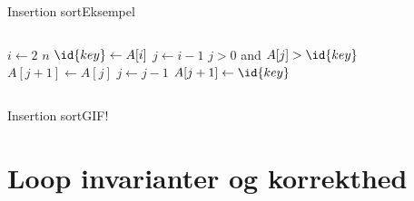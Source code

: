 \documentclass[aspectratio=1610]{beamer}
\begin{document}
\begin{frame}[fragile]{Insertion sort}{Eksempel}
\begin{columns}

        \begin{minipage}{\textwidth}%
            \small

            \vspace{-\abovedisplayskip}
            \begin{codebox}
                \li \For $i \gets 2$ \To $n$ \Do
                    \li $\id{key} \gets A[i]$
                    \li $j \gets i - 1$
                    \li \While $j > 0$ and $A[j] > \id{key}$ \Do
                        \li $A[j+1] \gets A[j]$
                        \li $j \gets j - 1$
                    \End
                    \li $A[j+1] \gets \id{key}$
                \End
            \end{codebox}
            
        \end{minipage}

    \end{columns}

\end{frame}

\begin{frame}{Insertion sort}{GIF!}
    \centering
\end{frame}

\section{Loop invarianter og korrekthed}
\end{document}
